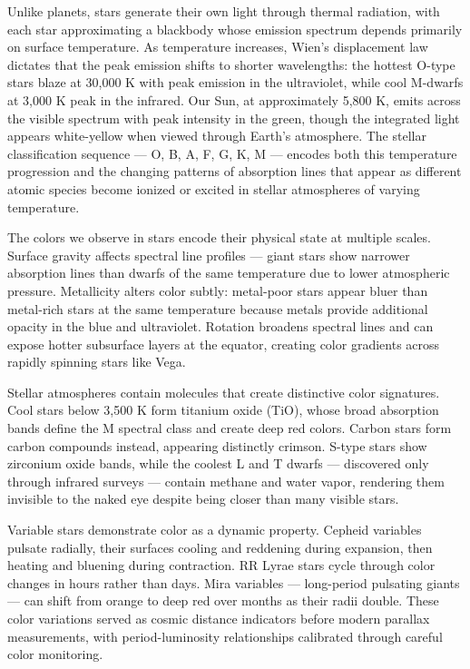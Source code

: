 Unlike planets, stars generate their own light through thermal radiation, with each star approximating a blackbody whose emission spectrum depends primarily on surface temperature. As temperature increases, Wien's displacement law dictates that the peak emission shifts to shorter wavelengths: the hottest O-type stars blaze at 30,000 K with peak emission in the ultraviolet, while cool M-dwarfs at 3,000 K peak in the infrared. Our Sun, at approximately 5,800 K, emits across the visible spectrum with peak intensity in the green, though the integrated light appears white-yellow when viewed through Earth's atmosphere. The stellar classification sequence — O, B, A, F, G, K, M — encodes both this temperature progression and the changing patterns of absorption lines that appear as different atomic species become ionized or excited in stellar atmospheres of varying temperature.

The colors we observe in stars encode their physical state at multiple scales. Surface gravity affects spectral line profiles — giant stars show narrower absorption lines than dwarfs of the same temperature due to lower atmospheric pressure. Metallicity alters color subtly: metal-poor stars appear bluer than metal-rich stars at the same temperature because metals provide additional opacity in the blue and ultraviolet. Rotation broadens spectral lines and can expose hotter subsurface layers at the equator, creating color gradients across rapidly spinning stars like Vega.

Stellar atmospheres contain molecules that create distinctive color signatures. Cool stars below 3,500 K form titanium oxide (TiO), whose broad absorption bands define the M spectral class and create deep red colors. Carbon stars form carbon compounds instead, appearing distinctly crimson. S-type stars show zirconium oxide bands, while the coolest L and T dwarfs — discovered only through infrared surveys — contain methane and water vapor, rendering them invisible to the naked eye despite being closer than many visible stars.

Variable stars demonstrate color as a dynamic property. Cepheid variables pulsate radially, their surfaces cooling and reddening during expansion, then heating and bluening during contraction. RR Lyrae stars cycle through color changes in hours rather than days. Mira variables — long-period pulsating giants — can shift from orange to deep red over months as their radii double. These color variations served as cosmic distance indicators before modern parallax measurements, with period-luminosity relationships calibrated through careful color monitoring.


